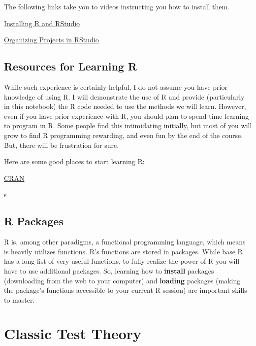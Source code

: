\documentclass[
]{book}
\begin{document}
The following links take you to videos instructing you how to install them.

\href{https://auburn.hosted.panopto.com/Panopto/Pages/Viewer.aspx?id=5dacd1fe-b888-407b-a89f-ac150135ace8}{Installing R and RStudio}

\href{https://auburn.hosted.panopto.com/Panopto/Pages/Viewer.aspx?id=aed0e2a9-004f-453f-80c7-abbe010a063b}{Organizing Projects in RStudio}

\hypertarget{resources-for-learning-r}{%
\section*{Resources for Learning R}\label{resources-for-learning-r}}

While such experience is certainly helpful, I do not assume you have prior knowledge of using R.
I will demonstrate the use of R and provide (particularly in this notebook) the R code needed to use the methods we will learn.
However, even if you have prior experience with R, you should plan to spend time learning to program in R.
Some people find this intimidating initially, but most of you will grow to find R programming rewarding, and even fun by the end of the course.
But, there will be frustration for sure.

Here are some good places to start learning R:

\href{https://cran.r-project.org/}{CRAN}

s

\hypertarget{r-packages}{%
\section*{R Packages}\label{r-packages}}

R is, among other paradigms, a functional programming language, which means is heavily utilizes functions.
R's functions are stored in packages.
While base R has a long list of very useful functions, to fully realize the power of R you will have to use additional packages.
So, learning how to \textbf{install} packages (downloading from the web to your computer) and \textbf{loading} packages (making the package's functions accessible to your current R session) are important skills to master.

\hypertarget{CCT}{%
\chapter{Classic Test Theory}\label{CCT}}
\end{document}
